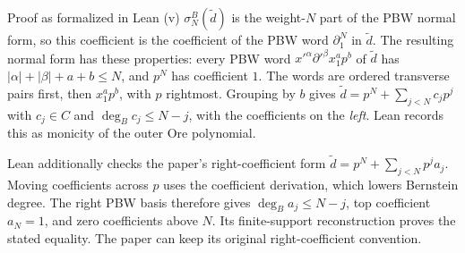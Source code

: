 \documentclass[11pt]{amsart}
\numberwithin{equation}{section}
\theoremstyle{plain}
\theoremstyle{remark}
\begin{document}
\begin{AIaddition}{Proof as formalized in Lean}
(v) $\sigma^B_N(\tilde d)$ is the weight-$N$ part of the PBW normal form, so
this coefficient is the coefficient of the PBW word $\partial_1^N$ in
$\tilde d$. The resulting normal form has these properties: every PBW word
$x'^{\alpha}\partial'^{\beta}x_1^{a}p^{b}$ of $\tilde d$ has
$|\alpha|+|\beta|+a+b\le N$, and $p^N$ has coefficient $1$. The words are
ordered transverse pairs first, then $x_1^ap^b$, with $p$ rightmost. Grouping
by $b$ gives
$\tilde d=p^N+\sum_{j<N}c_jp^j$ with $c_j\in C$ and $\deg_Bc_j\le N-j$, with
the coefficients on the \emph{left}. Lean records this as monicity of the
outer Ore polynomial.

Lean additionally checks the paper's right-coefficient form
$\tilde d=p^N+\sum_{j<N}p^ja_j$. Moving coefficients across $p$ uses the
coefficient derivation, which lowers Bernstein degree. The right PBW basis
therefore gives $\deg_Ba_j\le N-j$, top coefficient $a_N=1$, and zero
coefficients above $N$. Its finite-support reconstruction proves the
stated equality. The paper can keep its original right-coefficient convention.
\end{AIaddition}
\end{document}
